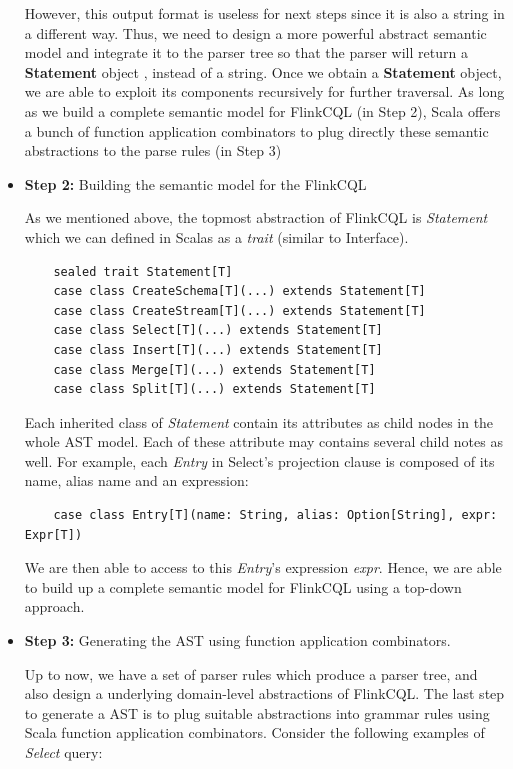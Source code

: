 \begin{itemize}
However, this output format is useless for next steps since it is also a string in a different way. Thus, we need to design a more powerful abstract semantic model and integrate it to the parser tree so that the parser will return a \textbf{Statement} object , instead of a string. Once we obtain a \textbf{Statement} object, we are able to exploit its components recursively for further traversal. As long as we build a complete semantic model for FlinkCQL (in Step 2), Scala offers a bunch of function application combinators to plug directly these semantic abstractions to the parse rules (in Step 3)

\item \textbf{Step 2:} Building the semantic model for the FlinkCQL

As we mentioned above, the topmost abstraction of FlinkCQL is \textit{Statement} which we can defined in Scalas as a \textit{trait} (similar to Interface).
\begin{lstlisting}
	sealed trait Statement[T]
	case class CreateSchema[T](...) extends Statement[T]
	case class CreateStream[T](...) extends Statement[T]
	case class Select[T](...) extends Statement[T]
	case class Insert[T](...) extends Statement[T]
	case class Merge[T](...) extends Statement[T]
	case class Split[T](...) extends Statement[T]
\end{lstlisting}

Each inherited class of \textit{Statement} contain its attributes as child nodes in the whole AST model. Each of these attribute may contains several child notes as well. For example, each \textit{Entry} in Select's projection clause is composed of its name, alias name and an expression:

\begin{lstlisting}
	case class Entry[T](name: String, alias: Option[String], expr: Expr[T])
\end{lstlisting}

We are then able to access to this \textit{Entry}'s expression \textit{expr}. Hence, we are able to build up a complete semantic model for FlinkCQL using a top-down approach.

\item \textbf{Step 3:} Generating the AST using function application combinators.

Up to now, we have a set of parser rules which produce a parser tree, and also design a underlying domain-level abstractions of FlinkCQL. The last step to generate a AST is to plug suitable abstractions into grammar rules using Scala function application combinators. Consider the following examples of \textit{Select} query:


\end{itemize}
